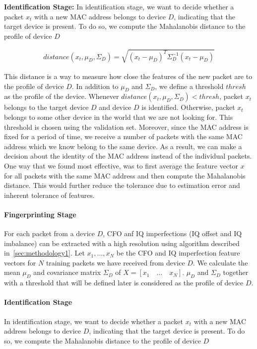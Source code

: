 \noindent\textbf{Identification Stage:} In identification stage, we want to decide whether a packet $x_t$ with a new MAC address belongs to device $D$, indicating that the target device is present. To do so, we compute the Mahalanobis distance to the profile of device $D$

\begin{gather*}
    distance(x_t,\mu_D,\Sigma_D) = \sqrt{(x_t-\mu_D)^T\Sigma_D^{-1}(x_t-\mu_D)}
\end{gather*}


This distance is a way to measure how close the features of the new packet are to the profile of device $D$. In addition to $\mu_D$ and $\Sigma_D$, we define a threshold $thresh$ as the profile of the device. Whenever $distance(x_t,\mu_D,\Sigma_D)<thresh$, packet $x_t$ belongs to the target device $D$ and device $D$ is identified. Otherwise, packet $x_t$ belongs to some other device in the world that we are not looking for. This threshold is chosen using the validation set.
Moreover, since the MAC address is fixed for a period of time, we receive a number of packets with the same MAC address which we know belong to the same device. As a result, we can make a decision about the identity of the MAC address instead of the individual packets. One way that we found most effective, was to first average the feature vector $x$ for all packets with the same MAC address and then compute the Mahalanobis distance. This would further reduce the tolerance due to estimation error and inherent tolerance of features.

\paragraph{Fingerprinting Stage} For each packet from a device $D$, CFO anf IQ imperfections (IQ offset and IQ imbalance) can be extracted with a high resolution using algorithm described in~\ref{sec:methodology1}. Let $x_1,...,x_N$ be the CFO and IQ imperfection feature vectors for $N$ training packets we have received from device $D$. We calculate the mean $\mu_D$ and covariance matrix $\Sigma_D$ of $X = [x_1 \quad ... \quad x_N]$. $\mu_D$ and $\Sigma_D$ together with a threshold that will be defined later is considered as the profile of device $D$.



\paragraph{Identification Stage} In identification stage, we want to decide whether a packet $x_t$ with a new MAC address belongs to device $D$, indicating that the target device is present. To do so, we compute the Mahalanobis distance to the profile of device $D$

